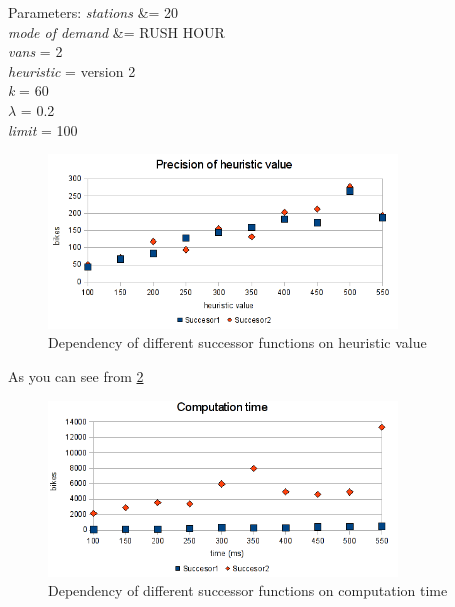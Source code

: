 \documentclass[11pt,twoside,a4paper]{mr}%
\begin{document}
\begin{tabbing}
Parameters:     \= \textit{stations} &=  20\\
		\> \textit{mode of demand}   &= RUSH HOUR \\
		\> \textit{vans} = 2 \\
		\> \textit{heuristic} = version 2 \\
		\> \textit{k} = 60 \\
		\> \textit{\(\lambda\)} = 0.2\\
		\> \textit{limit} = 100
 \end{tabbing}


\begin{figure}[ht]
\begin{center}
\includegraphics[width=350px]{images/s1-s2-h.png}
\caption{Dependency of different successor functions on heuristic value}
\label{sa:succ-time}
\end{center}
\end{figure}

As you can see from \ref{sa:succ-time}
\begin{figure}[ht]
\begin{center}
\includegraphics[width=350px]{images/s1-s2-time.png}
\caption{Dependency of different successor functions on computation time }
\label{sa:succ-time}
\end{center}
\end{figure}
\end{document}
